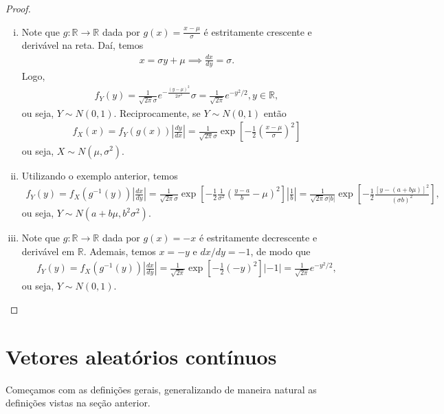 \documentclass[../Notas.tex]{subfiles}
\begin{document}
\begin{proof}
\begin{enumerate}[(i)]
    \item Note que $g:\mathbb{R}\to\mathbb{R}$ dada por $g(x) = \displaystyle{ \frac{x-\mu}{\sigma} }$ é estritamente crescente e derivável na reta. Daí, temos
    \begin{align*}
        x = \sigma y + \mu \implies \frac{dx}{dy} = \sigma.
    \end{align*}
    Logo, 
    \begin{align*}
        f_Y(y) = \frac{1}{\sqrt{2\pi}\sigma}e^{ -\frac{(y-\mu)^2}{2\sigma^2} }\sigma = \frac{1}{\sqrt{2\pi}}e^{-y^2/2}, y\in\mathbb{R},
    \end{align*}
    ou seja, $Y\sim N(0,1)$. Reciprocamente, se $Y\sim N(0,1)$ então
    \begin{align*}
        f_X(x) = f_Y(g(x))\left|\frac{dy}{dx}\right| = \frac{1}{\sqrt{2\pi}\sigma}\exp[-\frac{1}{2}(\frac{x-\mu}{\sigma})^2]
    \end{align*}
    ou seja, $X\sim N(\mu, \sigma^2)$.
    \item Utilizando o exemplo anterior, temos
    \begin{align*}
        f_Y(y) = f_X(g^{-1}(y))\left|\frac{dx}{dy}\right| = \frac{1}{\sqrt{2\pi}\sigma}\exp[-\frac{1}{2}\frac{1}{\sigma^2}(\frac{y-a}{b} - \mu)^2]\left|\frac{1}{b}\right| = \frac{1}{\sqrt{2\pi}\sigma|b|} \exp[ -\frac{1}{2}\frac{ [ y - (a+b\mu) ]^2 }{ (\sigma b)^2 } ],
    \end{align*}
    ou seja, $Y\sim N(a + b\mu, b^2\sigma^2)$.
    \item Note que $g:\mathbb{R}\to\mathbb{R}$ dada por $g(x) = -x$ é estritamente decrescente e derivável em $\mathbb{R}$. Ademais, temos $x = -y$ e $dx/dy = -1$, de modo que
    \begin{align*}
        f_Y(y) = f_X(g^{-1}(y)) \left|\frac{dx}{dy}\right| = \frac{1}{\sqrt{2\pi}}\exp[ -\frac{1}{2}(-y)^2 ]|-1| = \frac{1}{\sqrt{2\pi}} e^{-y^2/2},
    \end{align*}
    ou seja, $Y\sim N(0,1)$.
\end{enumerate}
\end{proof}

\section{Vetores aleatórios contínuos}
Começamos com as definições gerais, generalizando de maneira natural as definições vistas na seção anterior.
\end{document}
